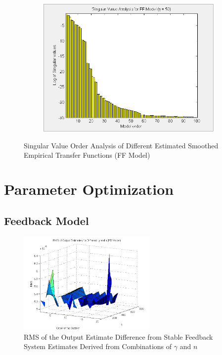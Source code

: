 \begin{landscape}
\begin{figure}[H]
\begin{subfigure}[b]{0.38\textwidth}
\label{pic:}
\end{subfigure}\;\begin{subfigure}[b]{0.38\textwidth}
\includegraphics[width=1.0\textwidth]{pics/SVD_FF_50}

\label{pic:}
\end{subfigure}
\caption{Singular Value Order Analysis of Different Estimated Smoothed Empirical Transfer Functions (FF Model)}
\end{figure}

 \end{landscape}


\chapter{Parameter Optimization}\label{sec:RMS}

\section{Feedback Model}
\begin{figure}[h]
\centering
\includegraphics[width=0.6\textwidth]{pics/RMS_FB}
\caption{RMS of the Output Estimate Difference from Stable Feedback System Estimates Derived from Combinations of $\gamma$ and $n$}
\label{fig:RMS_FB}
\end{figure}

